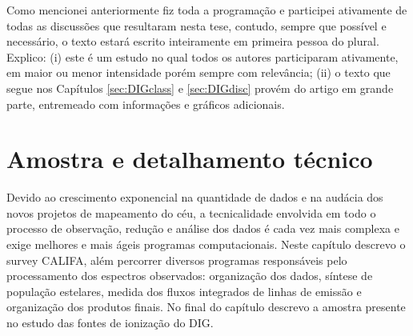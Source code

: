 Como mencionei anteriormente fiz toda a programação e participei ativamente de todas as discussões que resultaram nesta tese, contudo, sempre que possível e necessário, o texto estará escrito inteiramente em primeira pessoa do plural. Explico: (i) este é um estudo no qual todos os autores participaram ativamente, em maior ou menor intensidade porém sempre com relevância; (ii) o texto que segue nos Capítulos \ref{sec:DIGclass} e \ref{sec:DIGdisc} provém do artigo \citet[][Apêndice \ref{apendice:DIGpaper0}]{Lacerda.etal.2018} em grande parte, entremeado com informações e gráficos adicionais.






\chapter{Amostra e detalhamento técnico}
\label{sec:sample}   %

Devido ao crescimento exponencial na quantidade de dados e na audácia dos novos projetos de mapeamento do céu, a tecnicalidade envolvida em todo o processo de observação, redução e análise dos dados é cada vez mais complexa e exige melhores e mais ágeis programas computacionais. Neste capítulo descrevo o survey CALIFA, além percorrer diversos programas responsáveis pelo processamento dos espectros observados: organização dos dados, síntese de população estelares, medida dos fluxos integrados de linhas de emissão e organização dos produtos finais. No final do capítulo descrevo a amostra presente no estudo das fontes de ionização do DIG.

